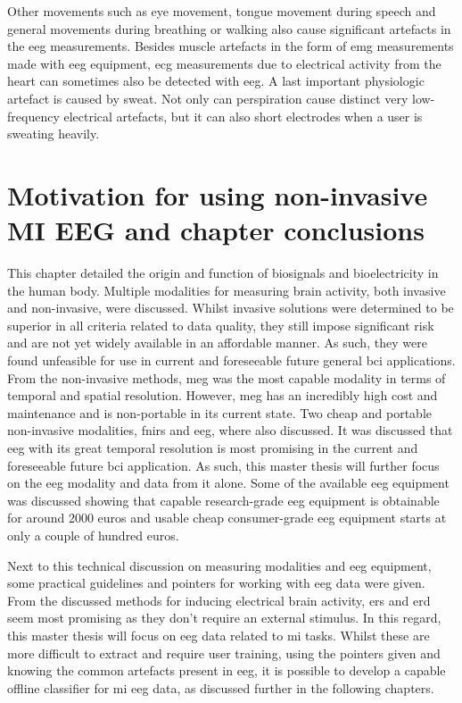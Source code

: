 Other movements such as eye movement, tongue movement during speech and general movements during breathing or walking also cause significant artefacts in the \gls{eeg} measurements.
Besides muscle artefacts in the form of \gls{emg} measurements made with \gls{eeg} equipment, \gls{ecg} measurements due to electrical activity from the heart can sometimes also be detected with \gls{eeg}.
A last important physiologic artefact is caused by sweat.
Not only can perspiration cause distinct very low-frequency electrical artefacts, but it can also short electrodes when a user is sweating heavily.




\section{Motivation for using non-invasive MI EEG and chapter conclusions}
\label{sec:biomedical_signals_summary}

This chapter detailed the origin and function of \glspl{biosignal} and bioelectricity in the human body.
Multiple modalities for measuring brain activity, both invasive and non-invasive, were discussed.
Whilst invasive solutions were determined to be superior in all criteria related to data quality, they still impose significant risk and are not yet widely available in an affordable manner.
As such, they were found unfeasible for use in current and foreseeable future general \gls{bci} applications.
From the non-invasive methods, \gls{meg} was the most capable modality in terms of temporal and spatial resolution.
However, \gls{meg} has an incredibly high cost and maintenance and is non-portable in its current state.
Two cheap and portable non-invasive modalities, \gls{fnirs} and \gls{eeg}, where also discussed.
It was discussed that \gls{eeg} with its great temporal resolution is most promising in the current and foreseeable future \gls{bci} application.
As such, this master thesis will further focus on the \gls{eeg} modality and data from it alone.
Some of the available \gls{eeg} equipment was discussed showing that capable research-grade \gls{eeg} equipment is obtainable for around 2000 euros and usable cheap consumer-grade \gls{eeg} equipment starts at only a couple of hundred euros.

Next to this technical discussion on measuring modalities and \gls{eeg} equipment, some practical guidelines and pointers for working with \gls{eeg} data were given.
From the discussed methods for inducing electrical brain activity, \gls{ers} and \gls{erd} seem most promising as they don't require an external stimulus.
In this regard, this master thesis will focus on \gls{eeg} data related to \gls{mi} tasks.
Whilst these are more difficult to extract and require user training, using the pointers given and knowing the common artefacts present in \gls{eeg}, it is possible to develop a capable offline classifier for \gls{mi} \gls{eeg} data, as discussed further in the following chapters.
